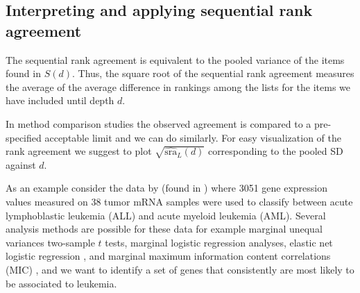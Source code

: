 \documentclass[oupdraft]{bio}
\begin{document}
\subsection{Interpreting and applying sequential rank agreement}
\label{sec:amfol}


The sequential rank agreement is equivalent to the pooled variance of
the items found in $S(d)$. Thus, the square root of the sequential
rank agreement measures the average of the average difference in
rankings among the lists for the items we have included until depth
$d$.

In method comparison studies the observed agreement is compared to a
pre-specified acceptable limit and we can do similarly. For easy
visualization of the rank agreement we suggest to plot
$\sqrt{\widehat{\textrm{sra}}_L(d)}$ corresponding to the pooled SD
against $d$.


As an example consider the data by \citet{Golub1999} (found in
\citet{Dudoit2002}) where 3051 gene expression values measured on 38
tumor mRNA samples were used to classify between acute lymphoblastic
leukemia (ALL) and acute myeloid leukemia (AML). Several 
analysis methods are possible for these data for example marginal unequal
variances two-sample $t$ tests, marginal logistic regression analyses,
elastic net logistic regression \citep{friedman2010regularization},
and marginal maximum information content correlations (MIC)
\citep{Reshef2011}, and we want to identify a set of genes that
consistently are most likely to be associated to leukemia.
\end{document}
